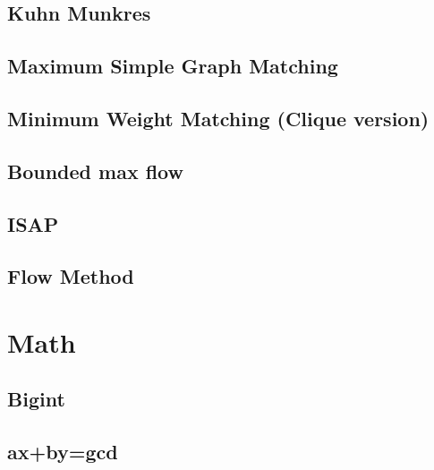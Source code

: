 \documentclass[a4paper,10pt,twocolumn,oneside]{article}
\begin{document}
\subsection{Kuhn Munkres}


\subsection{Maximum Simple Graph Matching}


\subsection{Minimum Weight Matching (Clique version)}


% 

\subsection{Bounded max flow}


\subsection{ISAP}


\subsection{Flow Method}


\section{Math}

\subsection{Bigint}


\subsection{ax+by=gcd}

\end{document}
